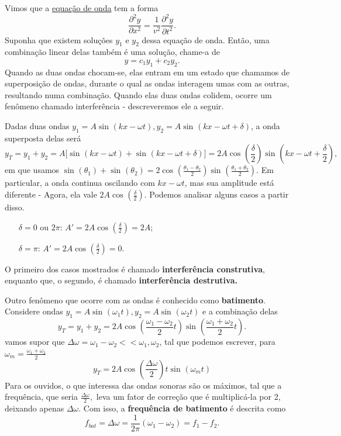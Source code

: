\documentclass{article}
\begin{document}
Vimos que a \hyperlink{wave_eqn}{equação de onda} tem a forma 
\[
  \frac{\partial^{2}y}{\partial x^{2}} = \frac{1}{v^{2}}\frac{\partial^{2}y}{\partial t^{2}}.
\]
Suponha que existem soluções \(y_{1}\) e \(y_{2}\) dessa equação de onda. Então, uma combinação linear delas também é uma solução, chame-a de 
\[
  y = c_{1}y_{1} + c_{2}y_{2}.
\]
Quando as duas ondas chocam-se, elas entram em um estado que chamamos de superposição de ondas, durante o qual as ondas interagem umas com as outras,
resultando numa combinação. Quando elas duas ondas colidem, ocorre um fenômeno chamado interferência - descreveremos ele a seguir.

Dadas duas ondas \(y_{1} = A\sin^{}{(kx - \omega t)}, y_{2} = A\sin^{}{(kx - \omega t + \delta )}\), a onda superposta delas será 
\[
  y_{T} = y_{1} + y_{2} = A \biggl[\sin^{}{(kx-\omega t)} + \sin^{}{(kx-\omega t+\delta )}\biggr] = 2A\cos^{}{(\frac{\delta }{2})}\sin^{}{(kx-\omega t+\frac{\delta }{2})},
\]
em que usamos \(\sin^{}{(\theta_{1})}+\sin^{}{(\theta_{2})} = 2\cos^{}{(\frac{\theta_{1}-\theta_{2}}{2})}\sin^{}{(\frac{\theta_{1}+\theta_{2}}{2})}\). Em particular, a onda continua
oscilando com \(kx-\omega t\), mas sua amplitude está diferente - Agora, ela vale \(2A\cos^{}{(\frac{\delta }{2})}\). Podemos analisar alguns casos a partir disso.
\begin{itemize}
  \item[\(\delta = 0\text{ ou } 2\pi \):] \(A' = 2A\cos^{}{(\frac{\delta }{2})} = 2A;\)
  \item[\(\delta = \pi \):] \(A' = 2A\cos^{}{(\frac{\delta }{2})} = 0.\)
\end{itemize}
O primeiro dos casos mostrados é chamado \textbf{interferência construtiva}, enquanto que, o segundo, é chamado \textbf{interferência destrutiva.}

Outro fenômeno que ocorre com as ondas é conhecido como \textbf{batimento}. Considere ondas \(y_{1} = A\sin^{}{(\omega_{1}t)}, y_{2} = A\sin^{}{(\omega_{2}t)}\) e a combinação
delas 
\[
  y_{T} = y_{1}+y_{2} = 2A\cos^{}{(\frac{\omega_{1}-\omega_{2}}{2}t)}\sin^{}{(\frac{\omega_{1}+\omega_{2}}{2}t)}.
\]
vamos supor que \(\Delta \omega = \omega_{1} - \omega_{2} <<\omega_{1}, \omega_{2}\), tal que podemos escrever, para 
\(\omega _{m} = \frac{\omega_{1}+\omega_{2}}{2}\)
\[
  y_{T} = 2A\cos^{}{(\frac{\Delta \omega }{2})t}\sin^{}{(\omega_{m}t)}
\]
Para os ouvidos, o que interessa das ondas sonoras são os máximos, tal que a frequência, que seria \(\frac{\Delta \omega }{2},\) leva um fator de correção
que é multiplicá-la por 2, deixando apenas \(\Delta \omega .\) Com isso, a \textbf{frequência de batimento} é descrita como 
\[
  f_{bat} = \Delta \omega = \frac{1}{2\pi }(\omega_{1}-\omega _{2}) = f_{1}-f_{2}.
\]
\newpage
\end{document}

